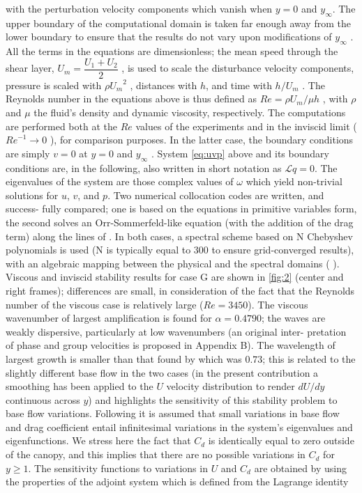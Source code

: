 with the perturbation velocity components which vanish when $y=0$ and $y_{\infty}$. The upper boundary
of the computational domain is taken far enough away from the lower boundary to ensure that the
results do not vary upon modifications of $y_{\infty}$ . All the terms in the equations are dimensionless; the
mean speed through the shear layer, $U_m = \dfrac{U_1 +U_2}{2}$ , is used to scale the disturbance velocity components, pressure is scaled with
$\rho {U_m}^2$ , distances with $h$, and time with $h/U_m$ . The Reynolds number
in the equations above is thus defined as $Re = \rho U_m/ \mu h$ , with $\rho$ and $\mu$ the fluid’s density and dynamic
viscosity, respectively. The computations are performed both at the $Re$ values of the experiments
and in the inviscid limit (${Re}^{-1}  \rightarrow 0$ ), for comparison purposes. In the latter case, the boundary
conditions are simply $v = 0$ at $y = 0$ and $y_{\infty}$ .
System \ref{eq:uvp} above and its boundary conditions are, in the following, also written in short
notation as $\mathscr{L} q = 0$. The eigenvalues of the system are those complex values of $\omega$ which yield
non-trivial solutions for $u$, $v$, and $p$. Two numerical collocation codes are written, and success-
fully compared; one is based on the equations in primitive variables form, the second solves an
Orr-Sommerfeld-like equation (with the addition of the drag term) along the lines of \cite{singh2016linear}.
In both cases, a spectral scheme based on N Chebyshev polynomials is used (N is typically equal
to 300 to ensure grid-converged results), with an algebraic mapping between the physical and the
spectral domains (\cite{hussaini1987spectral} ).
Viscous and inviscid stability results for case G are shown in \ref{fig:2} (center and right frames);
differences are small, in consideration of the fact that the Reynolds number of the viscous case
is relatively large ($Re = 3450$). The viscous wavenumber of largest amplification is found for
$\alpha = 0.4790$; the waves are weakly dispersive, particularly at low wavenumbers (an original inter-
pretation of phase and group velocities is proposed in Appendix B). The wavelength of largest
growth is smaller than that found by \cite{zampogna2016instability} which was $0.73$; this is related to the slightly
different base flow in the two cases (in the present contribution a smoothing has been applied to the
$U$ velocity distribution to render $dU/dy$ continuous across $y$) and highlights the sensitivity of this
stability problem to base flow variations.
Following \cite{bottaro2003effect} it is assumed that small variations in base flow and drag coefficient
entail infinitesimal variations in the system’s eigenvalues and eigenfunctions. We stress here the fact
that $C_d$ is identically equal to zero outside of the canopy, and this implies that there are no possible
variations in $C_d$ for $y \geq 1$. The sensitivity functions to variations in $U$ and $C_d$ are obtained by using
the properties of the adjoint system which is defined from the Lagrange identity

